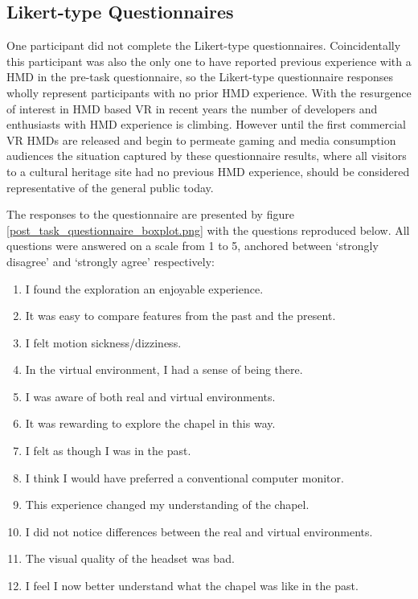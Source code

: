 
\subsection{Likert-type Questionnaires}

One participant did not complete the Likert-type questionnaires. Coincidentally this participant was also the only one to have reported previous experience with a HMD in the pre-task questionnaire, so the Likert-type questionnaire responses wholly represent participants with no prior HMD experience. With the resurgence of interest in HMD based VR in recent years the number of developers and enthusiasts with HMD experience is climbing. However until the first commercial VR HMDs are released and begin to permeate gaming and media consumption audiences the situation captured by these questionnaire results, where all visitors to a cultural heritage site had no previous HMD experience, should be considered representative of the general public today.

The responses to the questionnaire are presented by figure \ref{post_task_questionnaire_boxplot.png} with the questions reproduced below. All questions were answered on a scale from 1 to 5, anchored between `strongly disagree' and `strongly agree' respectively:
\begin{enumerate}
	\item I found the exploration an enjoyable experience.
	\item It was easy to compare features from the past and the present.
	\item I felt motion sickness/dizziness.
	\item In the virtual environment, I had a sense of being there.
	\item I was aware of both real and virtual environments.
	\item It was rewarding to explore the chapel in this way.
	\item I felt as though I was in the past.
	\item I think I would have preferred a conventional computer monitor.
	\item This experience changed my understanding of the chapel.
	\item I did not notice differences between the real and virtual environments.
	\item The visual quality of the headset was bad.
	\item I feel I now better understand what the chapel was like in the past.
\end{enumerate}

